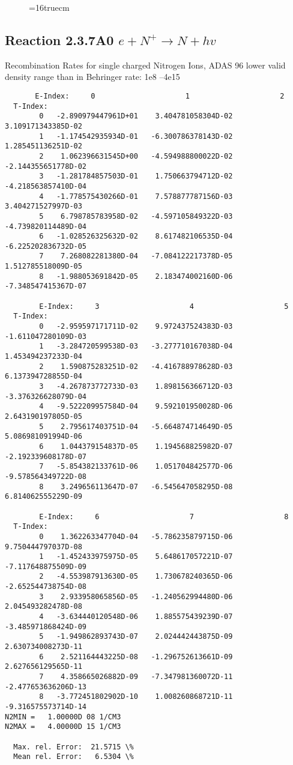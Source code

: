 \documentclass[12pt,dvipdfmx]{article}
\begin{document}
\begin{figure} \label{2.3.6A0}
\epsfxsize=16truecm
\end{figure}
\newpage
\subsection{
Reaction 2.3.7A0  $e + N^{+} \rightarrow N + hv$ }
 Recombination Rates for single  charged Nitrogen Ions, ADAS 96
 lower valid density range than in Behringer rate: 1e8 --4e15

\begin{small}\begin{verbatim}
       E-Index:     0                     1                     2
  T-Index:
        0   -2.890979447961D+01    3.404781058304D-02    3.109171343385D-02
        1   -1.174542935934D-01   -6.300786378143D-02    1.285451136251D-02
        2    1.062396631545D+00   -4.594988800022D-02   -2.144355651778D-02
        3   -1.281784857503D-01    1.750663794712D-02   -4.218563857410D-04
        4   -1.778575430266D-01    7.578877787156D-03    3.404271527997D-03
        5    6.798785783958D-02   -4.597105849322D-03   -4.739820114489D-04
        6   -1.028526325632D-02    8.617482106535D-04   -6.225202836732D-05
        7    7.268082281380D-04   -7.084122217378D-05    1.512785518009D-05
        8   -1.988053691842D-05    2.183474002160D-06   -7.348547415367D-07

        E-Index:     3                     4                     5
  T-Index:
        0   -2.959597171711D-02    9.972437524383D-03   -1.611047280109D-03
        1   -3.284720599538D-03   -3.277710167038D-04    1.453494237233D-04
        2    1.590875283251D-02   -4.416788978628D-03    6.137394728855D-04
        3   -4.267873772733D-03    1.898156366712D-03   -3.376326628079D-04
        4   -9.522209957584D-04    9.592101950028D-06    2.643190197805D-05
        5    2.795617403751D-04   -5.664874714649D-05    5.086981091994D-06
        6    1.044379154837D-05    1.194568825982D-07   -2.192339608178D-07
        7   -5.854382133761D-06    1.051704842577D-06   -9.578564349722D-08
        8    3.249656113647D-07   -6.545647058295D-08    6.814062555229D-09

        E-Index:     6                     7                     8
  T-Index:
        0    1.362263347704D-04   -5.786235879715D-06    9.750444797037D-08
        1   -1.452433975975D-05    5.648617057221D-07   -7.117648875509D-09
        2   -4.553987913630D-05    1.730678240365D-06   -2.652544738754D-08
        3    2.933958065856D-05   -1.240562994480D-06    2.045493282478D-08
        4   -3.634440120548D-06    1.885575439239D-07   -3.485971868424D-09
        5   -1.949862893743D-07    2.024442443875D-09    2.630734008273D-11
        6    2.521164443225D-08   -1.296752613661D-09    2.627656129565D-11
        7    4.358665026882D-09   -7.347981360072D-11   -2.477653636206D-13
        8   -3.772451802902D-10    1.008260868721D-11   -9.316575573714D-14
N2MIN =   1.00000D 08 1/CM3
N2MAX =   4.00000D 15 1/CM3

  Max. rel. Error:  21.5715 \%
  Mean rel. Error:   6.5304 \%

\end{verbatim}\end{small}
\end{document}
